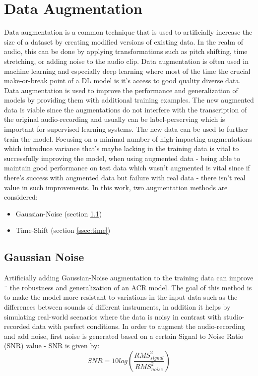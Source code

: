 \documentclass[a4paper]{article}
\begin{document}
\section{Data Augmentation} \label{sec:data_aug}
Data augmentation \cite{augment1, augment2} is a common technique that is used to artificially increase the
size of a dataset by creating modified versions of existing data. In the realm of audio, this can be done by applying
transformations such as pitch shifting, time stretching, or adding noise to the audio clip.
Data augmentation is often
used in machine learning and especially deep learning where most of the time the crucial make-or-break point of a DL model is it's access to good quality diverse data. Data augmentation is used to improve the performance and generalization of models by providing them with additional
training examples. The new augmented data is viable since the augmentations do not interfere with the transcription
of the original audio-recording and usually can be label-perserving which is important for supervised learning systems. The new data can be used to further train the model.
Focusing on a minimal number of high-impacting augmentations which introduce variance that's maybe lacking in the training data is vital to successfully improving the model, when using augmented data - being able to maintain good performance on test data which wasn't augmented is vital since if there's success with augmented data but failure with real data - there isn't real value in such improvements. In this work, two augmentation methods are considered:
\begin{itemize}
\item Gaussian-Noise \cite{augment_noise} (section \ref{ssec:noise})
\item Time-Shift \cite{augment_time1, augment_time2} (section \ref{ssec:time})
\end{itemize}

\subsection{Gaussian Noise} \label{ssec:noise}
Artificially adding Gaussian-Noise augmentation to the training data can improve ¨
the robustness and generalization of an ACR model. The goal of this method is to make the model more resistant
to variations in the input data such as the differences between sounds of different instruments, in addition it helps by simulating real-world scenarios where the data is noisy in contrast with studio-recorded data with perfect conditions.
In order to augment the audio-recording and add noise, first noise is generated based on a certain Signal to Noise Ratio (SNR) value - SNR is given by: 
\begin{equation}
   SNR = 10log(\frac{RMS_{signal}^2}{RMS_{noise}^2})
   \label{eqn:snr}
\end{equation}
\end{document}
